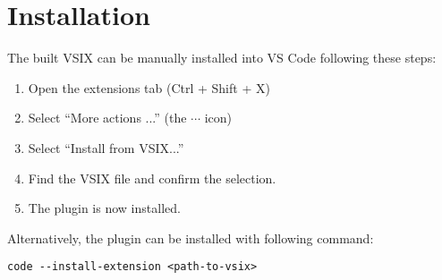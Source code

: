 \section{Installation}
The built VSIX can be manually installed into VS Code following these steps:
\begin{enumerate}
	\item Open the extensions tab (Ctrl + Shift + X)
	\item Select ``More actions ...'' (the $\cdots$ icon)
	\item Select ``Install from VSIX...''
	\item Find the VSIX file and confirm the selection.
	\item The plugin is now installed.
\end{enumerate}

Alternatively, the plugin can be installed with following command:
\begin{verbatim}
code --install-extension <path-to-vsix>
\end{verbatim}